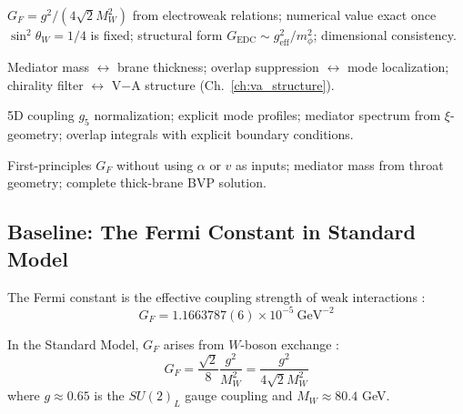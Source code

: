 
\begin{tcolorbox}[colback=blue!5, colframe=blue!50!black,
    title=\textbf{Reader Map: What This Chapter Establishes}]
\begin{description}[style=nextline, leftmargin=1em, font=\normalfont\bfseries]
    \item[Derived \tagDc{}:]
        $G_F = g^2/(4\sqrt{2}M_W^2)$ from electroweak relations;
        numerical value exact once $\sin^2\theta_W = 1/4$ is fixed;
        structural form $G_{\text{EDC}} \sim g_{\text{eff}}^2/m_\phi^2$;
        dimensional consistency.

    \item[Identified \tagI{}:]
        Mediator mass $\leftrightarrow$ brane thickness;
        overlap suppression $\leftrightarrow$ mode localization;
        chirality filter $\leftrightarrow$ V$-$A structure (Ch.~\ref{ch:va_structure}).

    \item[Postulated \tagP{}:]
        5D coupling $g_5$ normalization;
        explicit mode profiles;
        mediator spectrum from $\xi$-geometry;
        overlap integrals with explicit boundary conditions.

    \item[Open (not addressed):]
        First-principles $G_F$ without using $\alpha$ or $v$ as inputs;
        mediator mass from throat geometry;
        complete thick-brane BVP solution.
\end{description}
\end{tcolorbox}

\subsection{Baseline: The Fermi Constant in Standard Model}
\label{sec:ch11_baseline}

The Fermi constant is the effective coupling strength of weak interactions \tagBL{}:
\begin{equation}
    G_F = 1.1663787(6) \times 10^{-5}~\text{GeV}^{-2}
    \label{eq:ch11_GF_value}
\end{equation}

In the Standard Model, $G_F$ arises from $W$-boson exchange \tagBL{}:
\begin{equation}
    G_F = \frac{\sqrt{2}}{8} \frac{g^2}{M_W^2} = \frac{g^2}{4\sqrt{2} M_W^2}
    \label{eq:ch11_GF_SM}
\end{equation}
where $g \approx 0.65$ is the $SU(2)_L$ gauge coupling and $M_W \approx 80.4$ GeV.

